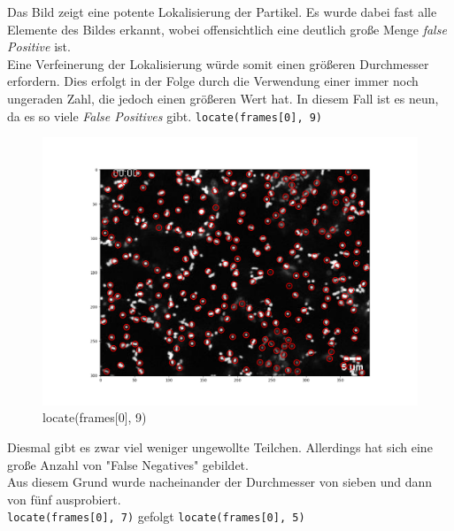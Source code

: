\begin{enumerate}
Das Bild zeigt eine potente Lokalisierung der Partikel. Es wurde dabei fast alle Elemente des Bildes erkannt, wobei offensichtlich eine deutlich große Menge \textit{false Positive} ist. \\
Eine Verfeinerung der Lokalisierung würde somit einen größeren Durchmesser erfordern. Dies erfolgt in der Folge durch die Verwendung einer immer noch ungeraden Zahl, die jedoch einen größeren Wert hat. In diesem Fall ist es neun, da es so viele \textit{False Positives} gibt. 
\texttt{locate(frames[0], 9)}

\begin{figure}[H]
    \centering
    \includegraphics[scale=0.35]{Grafiken/trackpyBilder/locate(frames[0], 9).png}
    \caption{locate(frames[0], 9)}
    \label{fig:bild_label}
\end{figure} 

Diesmal gibt es zwar viel weniger ungewollte Teilchen. Allerdings hat sich eine große Anzahl von "False Negatives" gebildet. \\
Aus diesem Grund wurde nacheinander der Durchmesser von sieben und dann von fünf ausprobiert.\\
\texttt{locate(frames[0], 7)}   gefolgt  \texttt{locate(frames[0], 5)}
\newpage


\end{enumerate}
